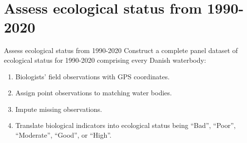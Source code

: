 \section{Assess ecological status from 1990-2020}

\begin{frame}{Assess ecological status from 1990-2020}
  Construct a complete panel dataset of ecological status for 1990-2020 comprising every Danish waterbody\pause:
  \begin{enumerate}
    \item Biologists' field observations with GPS coordinates.
    \pause
    \item Assign point observations to matching water bodies.
    \pause
    \item Impute missing observations.
    \pause
    \item Translate biological indicators into ecological status being “Bad”, “Poor”, “Moderate”, “Good”, or “High”.
  \end{enumerate}
\end{frame}
